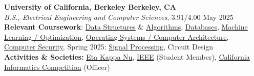\textbf{University of California, Berkeley \hfill Berkeley, CA} \\
\textit{B.S., Electrical Engineering and Computer Sciences}, 3.91/4.00 \hfill May 2025 \\
\textbf{Relevant Coursework}: \href{https://sp23.datastructur.es/}{Data Structures} \& \href{https://cs170.org/}{Algorithms}, \href{https://cs186berkeley.net/}{Databases}, \href{https://eecs16b.org/}{Machine Learning / Optimization}, \href{https://cs61c.org}{Operating Systems / Computer Architecture}, \href{https://sp24.cs161.org/}{Computer Security}, Spring 2025: \href{https://ee120-course-staff.github.io/}{Signal Processing}, Circuit Design \\
\textbf{Activities \& Societies:} \href{https://hkn.eecs.berkeley.edu/}{Eta Kappa Nu}, \href{https://www.ieee.org/}{IEEE} (Student Member), \href{https://calico.cs.berkeley.edu/}{California Informatics Competition} (Officer)